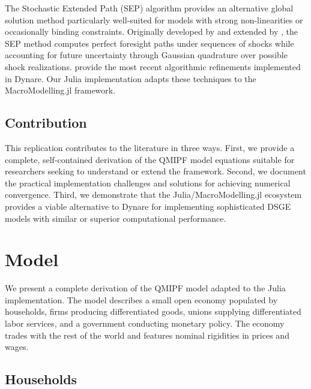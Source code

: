 \documentclass[12pt]{article}
\begin{document}
The Stochastic Extended Path (SEP) algorithm provides an alternative global solution method particularly well-suited for models with strong non-linearities or occasionally binding constraints. Originally developed by \citet{fair1983solution} and extended by \citet{adjemian2013stochastic}, the SEP method computes perfect foresight paths under sequences of shocks while accounting for future uncertainty through Gaussian quadrature over possible shock realizations. \citet{adjemian2025stochastic} provide the most recent algorithmic refinements implemented in Dynare. Our Julia implementation adapts these techniques to the MacroModelling.jl framework.

\subsection{Contribution}

This replication contributes to the literature in three ways. First, we provide a complete, self-contained derivation of the QMIPF model equations suitable for researchers seeking to understand or extend the framework. Second, we document the practical implementation challenges and solutions for achieving numerical convergence. Third, we demonstrate that the Julia/MacroModelling.jl ecosystem provides a viable alternative to Dynare for implementing sophisticated DSGE models with similar or superior computational performance.

\section{Model}\label{sec:model}

We present a complete derivation of the QMIPF model adapted to the Julia implementation. The model describes a small open economy populated by households, firms producing differentiated goods, unions supplying differentiated labor services, and a government conducting monetary policy. The economy trades with the rest of the world and features nominal rigidities in prices and wages.

\subsection{Households}
\end{document}
